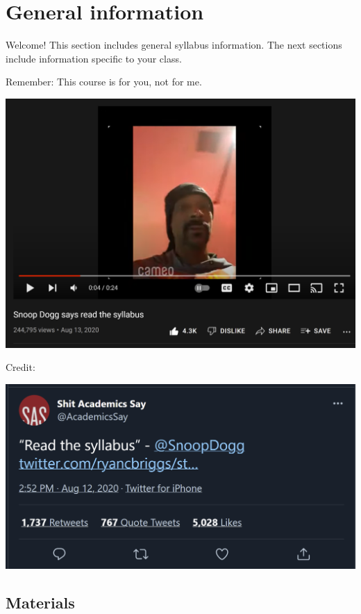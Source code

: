 \documentclass[
]{book}
\begin{document}
\hypertarget{general-information}{%
\chapter*{General information}\label{general-information}}

Welcome! This section includes general syllabus information. The next sections include information specific to your class.

Remember: This course is for you, not for me.

\includegraphics[width=29.86in]{img/snoop}

Credit:

\includegraphics[width=19.31in]{img/AcademicsSaystatus}

\hypertarget{materials}{%
\section{Materials}\label{materials}}
\end{document}
